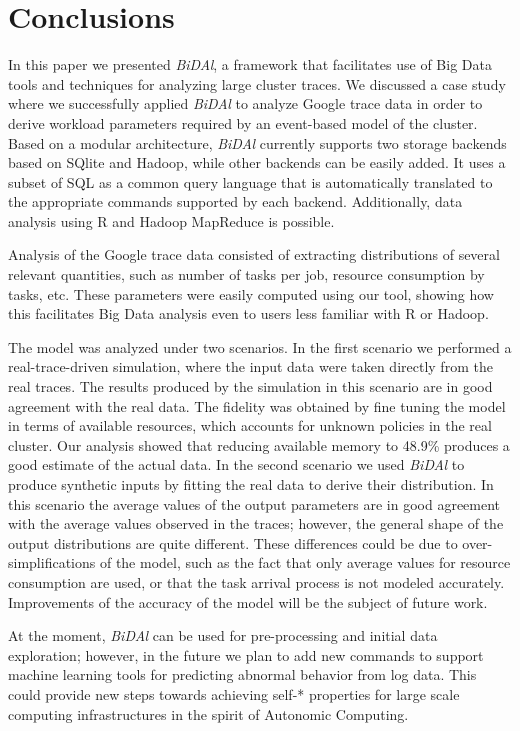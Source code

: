 \documentclass{article}
\begin{document}
\section{Conclusions}
\label{sec:conclusion}

In this paper we presented \emph{BiDAl}, a framework that facilitates use of Big Data tools and techniques for analyzing large cluster traces. We discussed  a case study where we successfully applied \emph{BiDAl} to analyze Google trace data in order to derive workload parameters required by an event-based model of the cluster. Based on a modular architecture, \emph{BiDAl} currently supports two storage backends based on SQlite and Hadoop, while other backends can be easily added. It uses a subset of SQL as a common query language that is automatically translated to the appropriate commands supported by each backend. Additionally, data analysis using R and Hadoop MapReduce is possible. 

Analysis of the Google trace data consisted of extracting distributions of several relevant quantities, such as number of tasks per job, resource consumption by tasks, etc. These parameters were easily computed using our tool, showing how this facilitates Big Data analysis even to users less familiar with R or Hadoop. 

The model was analyzed under two scenarios. In the first scenario we performed a real-trace-driven simulation, where the input data were taken directly from the real traces. The results produced by the simulation in this scenario are in good agreement with the real data. The fidelity was obtained by fine tuning the model in terms of available resources, which accounts for unknown policies in the real cluster. Our analysis showed that reducing available memory to 48.9\% produces a good estimate of the actual data. In the second scenario we used \emph{BiDAl} to produce synthetic inputs by fitting the real data to derive their distribution. In this scenario the average values of the output parameters are in good agreement with the average values observed in the traces; however, the general shape of the output distributions are quite different. These differences could be due to over-simplifications of the model, such as the fact that only average values for resource consumption are used, or that the task arrival process is not modeled accurately.  Improvements of the accuracy of the model will be the subject of future work.

At the moment, \emph{BiDAl} can be used for pre-processing and initial data exploration; however, in the future we plan to add new commands to support machine learning tools for predicting abnormal behavior from log data. This could provide new steps towards achieving self-* properties for large scale computing infrastructures in the spirit of Autonomic Computing.
\end{document}
